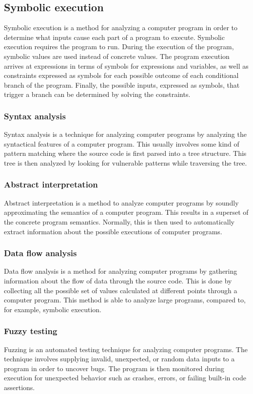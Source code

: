 \subsection{Symbolic execution}
\label{sec:symbolic-execution}
Symbolic execution is a method for analyzing a computer program in order to determine what inputs cause each part of a program to execute. Symbolic execution requires the program to run. During the execution of the program, symbolic values are used instead of concrete values. The program execution arrives at expressions in terms of symbols for expressions and variables, as well as constraints expressed as symbols for each possible outcome of each conditional branch of the program. Finally, the possible inputs, expressed as symbols, that trigger a branch can be determined by solving the constraints.

\subsubsection{Syntax analysis}
\label{sec:syntax-analysis}
Syntax analysis is a technique for analyzing computer programs by analyzing the syntactical features of a computer program. This usually involves some kind of pattern matching where the source code is first parsed into a tree structure. This tree is then analyzed by looking for vulnerable patterns while traversing the tree.

\subsubsection{Abstract interpretation}
\label{sec:abstract-interpretation}
Abstract interpretation is a method to analyze computer programs by soundly approximating the semantics of a computer program. This results in a superset of the concrete program semantics. Normally, this is then used to automatically extract information about the possible executions of computer programs.

\subsubsection{Data flow analysis}
\label{sec:data-flow-analysis}
Data flow analysis is a method for analyzing computer programs by gathering information about the flow of data through the source code. This is done by collecting all the possible set of values calculated at different points through a computer program. This method is able to analyze large programs, compared to, for example, symbolic execution.

\subsubsection{Fuzzy testing}
\label{sec:fuzzy-testing}
Fuzzing is an automated testing technique for analyzing computer programs. The technique involves supplying invalid, unexpected, or random data inputs to a program in order to uncover bugs. The program is then monitored during execution for unexpected behavior such as crashes, errors, or failing built-in code assertions.
